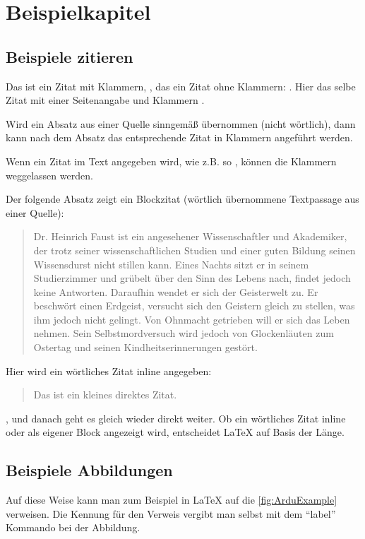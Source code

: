 \chapter{Beispielkapitel}
\section{Beispiele zitieren}

Das ist ein Zitat mit Klammern,
\citep{resnick_distributed_1996}, das ein Zitat ohne Klammern:
\cite{harel_situating_1991}. Hier das selbe Zitat mit einer Seitenangabe und Klammern \citep[S. 23]{resnick_distributed_1996}.

Wird ein Absatz aus einer Quelle sinngemäß übernommen (nicht wörtlich), dann kann nach dem Absatz das entsprechende Zitat in Klammern angeführt werden. \citep[S. 33]{anastopoulou_constructionism_2012}

Wenn ein Zitat im Text angegeben wird, wie z.B. so \cite{beer_rudolf_aspekte_2011}, können die Klammern weggelassen werden.

Der folgende Absatz zeigt ein Blockzitat (wörtlich übernommene Textpassage aus einer Quelle):

\blockcquote[S. 21]{ackermann_piagets_2001}{
	Dr. Heinrich Faust ist ein angesehener Wissenschaftler und Akademiker, der trotz seiner wissenschaftlichen Studien und einer guten Bildung seinen Wissensdurst nicht stillen kann. Eines Nachts sitzt er in seinem Studierzimmer und grübelt über den Sinn des Lebens nach, findet jedoch keine Antworten.
	Daraufhin wendet er sich der Geisterwelt zu. Er beschwört einen Erdgeist, versucht sich den Geistern gleich zu stellen, was ihm jedoch nicht gelingt. Von Ohnmacht getrieben will er sich das Leben nehmen. Sein Selbstmordversuch wird jedoch von Glockenläuten zum Ostertag und seinen Kindheitserinnerungen gestört.
}

Hier wird ein wörtliches Zitat inline angegeben: \blockcquote{gohlich_lernen:_2007}{Das ist ein kleines direktes Zitat.}, und danach geht es gleich wieder direkt weiter. Ob ein wörtliches Zitat inline oder als eigener Block angezeigt wird, entscheidet \LaTeX{} auf Basis der Länge.

\def \currentAuthor {Harald Sohm}

\section{Beispiele Abbildungen}
Auf diese Weise kann man zum Beispiel in \LaTeX{} auf die \cref{fig:ArduExample} verweisen. Die Kennung für den Verweis vergibt
man selbst mit dem "`label"' Kommando bei der Abbildung.

